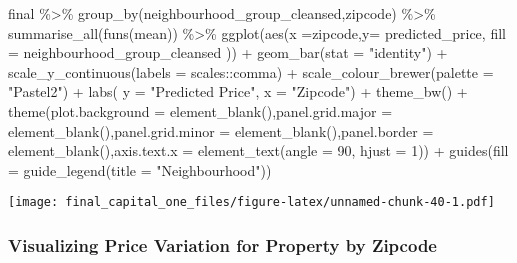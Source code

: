 \documentclass[
]{article}
\newenvironment{Shaded}{\begin{snugshade}}{\end{snugshade}}
\newcommand{\AttributeTok}[1]{\textcolor[rgb]{0.77,0.63,0.00}{#1}}
\newcommand{\DecValTok}[1]{\textcolor[rgb]{0.00,0.00,0.81}{#1}}
\newcommand{\FunctionTok}[1]{\textcolor[rgb]{0.00,0.00,0.00}{#1}}
\newcommand{\NormalTok}[1]{#1}
\newcommand{\SpecialCharTok}[1]{\textcolor[rgb]{0.00,0.00,0.00}{#1}}
\newcommand{\StringTok}[1]{\textcolor[rgb]{0.31,0.60,0.02}{#1}}
\begin{document}
\begin{Shaded}
\begin{Highlighting}[]
\NormalTok{final }\SpecialCharTok{\%\textgreater{}\%} \FunctionTok{group\_by}\NormalTok{(neighbourhood\_group\_cleansed,zipcode) }\SpecialCharTok{\%\textgreater{}\%} \FunctionTok{summarise\_all}\NormalTok{(}\FunctionTok{funs}\NormalTok{(mean)) }\SpecialCharTok{\%\textgreater{}\%} \FunctionTok{ggplot}\NormalTok{(}\FunctionTok{aes}\NormalTok{(}\AttributeTok{x =}\NormalTok{zipcode,}\AttributeTok{y=}\NormalTok{ predicted\_price, }\AttributeTok{fill =}\NormalTok{ neighbourhood\_group\_cleansed )) }\SpecialCharTok{+} \FunctionTok{geom\_bar}\NormalTok{(}\AttributeTok{stat =} \StringTok{"identity"}\NormalTok{) }\SpecialCharTok{+} \FunctionTok{scale\_y\_continuous}\NormalTok{(}\AttributeTok{labels =}\NormalTok{ scales}\SpecialCharTok{::}\NormalTok{comma) }\SpecialCharTok{+}  \FunctionTok{scale\_colour\_brewer}\NormalTok{(}\AttributeTok{palette =} \StringTok{"Pastel2"}\NormalTok{) }\SpecialCharTok{+} \FunctionTok{labs}\NormalTok{( }\AttributeTok{y =} \StringTok{"Predicted Price"}\NormalTok{, }\AttributeTok{x =} \StringTok{"Zipcode"}\NormalTok{) }\SpecialCharTok{+} \FunctionTok{theme\_bw}\NormalTok{() }\SpecialCharTok{+} \FunctionTok{theme}\NormalTok{(}\AttributeTok{plot.background =} \FunctionTok{element\_blank}\NormalTok{(),}\AttributeTok{panel.grid.major =} \FunctionTok{element\_blank}\NormalTok{(),}\AttributeTok{panel.grid.minor =} \FunctionTok{element\_blank}\NormalTok{(),}\AttributeTok{panel.border =} \FunctionTok{element\_blank}\NormalTok{(),}\AttributeTok{axis.text.x =} \FunctionTok{element\_text}\NormalTok{(}\AttributeTok{angle =} \DecValTok{90}\NormalTok{, }\AttributeTok{hjust =} \DecValTok{1}\NormalTok{)) }\SpecialCharTok{+} \FunctionTok{guides}\NormalTok{(}\AttributeTok{fill =} \FunctionTok{guide\_legend}\NormalTok{(}\AttributeTok{title =} \StringTok{"Neighbourhood"}\NormalTok{))}
\end{Highlighting}
\end{Shaded}

\texttt{[image: final\_capital\_one\_files/figure-latex/unnamed-chunk-40-1.pdf]}

\hypertarget{visualizing-price-variation-for-property-by-zipcode}{%
\subsubsection{Visualizing Price Variation for Property by
Zipcode}\label{visualizing-price-variation-for-property-by-zipcode}}
\end{document}
